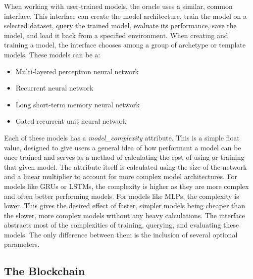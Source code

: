 \documentclass{article}
\begin{document}
    When working with user-trained models, the oracle uses a similar, common interface.  This interface can create the model
    architecture, train the model on a selected dataset, query the trained model, evaluate its performance, save the model,
    and load it back from a specified environment.  When creating and training a model, the interface chooses among a group
    of archetype or template models.  These models can be a:

    \begin{itemize}
        \item Multi-layered perceptron neural network
        \item Recurrent neural network
        \item Long short-term memory neural network
        \item Gated recurrent unit neural network
    \end{itemize}

    Each of these models has a \textit{model\_complexity} attribute.  This is a simple float value, designed to give users
    a general idea of how performant a model can be once trained and serves as a method of calculating the cost of using
    or training that given model.  The attribute itself is calculated using the size of the network and a linear multiplier to
    account for more complex model architectures.  For models like GRUs or LSTMs, the complexity is higher as they are more complex and often
    better performing models.  For models like MLPs, the complexity is lower.  This gives the desired effect of faster, simpler
    models being cheaper than the slower, more complex models without any heavy calculations.   The interface abstracts most
    of the complexities of training, querying, and evaluating these models.  The only difference between them is the inclusion
    of several optional parameters.

    \subsection{The Blockchain}
\end{document}
